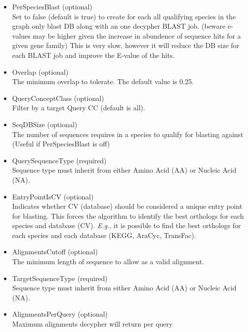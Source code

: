 \begin{itemize}
  
  \item{PerSpeciesBlast (optional)}\\
  Set to false (default is true) to create for each all qualifying species in the graph only blast DB along with an one decypher BLAST job. 
  (beware e-values may be higher given the increase in abundence of sequence hits for a given gene family) 
  This is very slow, however it will reduce the DB size for each BLAST job and improve the E-value of the hits.
  
  \item{Overlap (optional)}\\
  The minimum overlap to tolerate. The default value is 0.25.
  
  \item{QueryConceptClass (optional)}\\
  Filter by a target Query CC (default is all).
  
  \item{SeqDBSize (optional)}\\
  The number of sequences requires in a species to qualify for blasting against (Useful if PerSpeciesBlast is off)
  
  \item{QuerySequenceType (required)}\\
  Sequence type must inherit from either Amino Acid (AA) or Nucleic Acid (NA).
  
  \item{EntryPointIsCV (optional)}\\
  Indicates whether CV (database) should be considered a unique entry point for blasting.
  This forces the algorithm to identify the best orthologs for each species and database (CV).
  {\it{E.g.}}, it is possible to find the best orthologs for each species and each database (KEGG, AraCyc, TransFac).
  
  \item{AlignmentsCutoff (optional)}\\
  The minimum length of sequence to allow as a valid alignment.
  
  \item{TargetSequenceType (required)}\\
  Sequence type must inherit from either Amino Acid (AA) or Nucleic Acid (NA).
  
  \item{AlignmentsPerQuery (optional)}\\
  Maximum alignments decypher will return per query
  

\end{itemize}
